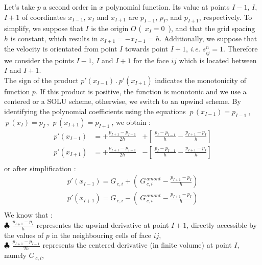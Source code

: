 Let's take  $p$ a second order in $x$ polynomial function. Its value at points $I-1$, $I$, $I+1$ of coordinates  $x_{I-1}$, $x_I$ and $x_{I+1}$ are $p_{I-1}$, $p_I$, and
$p_{I+1}$, respectively. To simplify, we
suppose that $I$ is the origin $O$ (~$x_I = 0$~), and that the grid spacing $h$ is constant,
which results in $ x_{I+1} = - x_{I-1} = h $. Additionally, we suppose that the
velocity is orientated from point $I$ towards point $I+1$, {\it i.e.} $s^n_{ij} =
1$. Therefore we consider the points $I-1$, $I$ and $I+1$ for  the face
$ij$ which is located between $I$ and $I+1$.\\
The sign of the product $ p'(x_{I-1})\,.\,p'(x_{I+1}) $ indicates the monotonicity
of function $p$. If this product is positive, the function is monotonic and
we use a centered or a SOLU scheme, otherwise, we switch to an upwind scheme. By identifying
the polynomial coefficients using the equations $\  p\,(x_{I-1}) = p_{I-1}\
$, $\ p\,(x_I) = p_I\ $,  $\ p\,(x_{I+1}) = p_{I+1}\ $, we obtain :\\
\begin{equation}
\begin{array}{lll}
p'(x_{I-1})& = + \displaystyle \frac{p_{I+1} -  p_{I-1}}{2h} & +
\left[\displaystyle {\ \frac{p_I - p_{I-1}}{h} - \frac{p_{I+1} -  p_I}{h} }\right]\\
p'(x_{I+1})& = + \displaystyle \frac{p_{I+1} -  p_{I-1}}{2h} & -
\left[\displaystyle {\ \frac{p_I - p_{I-1}}{h} - \frac{p_{I+1} -  p_I}{h} }\right] \\
\end{array}
\end{equation}
or after simplification :
\begin{equation}
\begin{array}{lll}
p'(x_{I-1}) = G_{\,c,i} + \left(\ G^{\,amont}_{\,c,i} - \displaystyle \frac{p_{I+1} -  p_I}{h}\right)\\
p'(x_{I+1}) = G_{\,c,i} - \left(\ G^{\,amont}_{\,c,i} - \displaystyle \frac{p_{I+1} -  p_I}{h}\right)\\
\end{array}
\end{equation}
We know that :\\
{\tiny $\clubsuit$} $\displaystyle \frac{p_{I+1} -  p_I}{h}$ representes the
upwind derivative at point $I+1$, directly accessible by the
values of $p$ in the neighbouring cells of face $ij$,\\
{\tiny $\clubsuit$} $\displaystyle \frac{p_{I+1} -  p_{I-1}}{2h}$ represents the
centered derivative (in finite volume) at point $I$, namely $ G_{\,c,i}$,\\
